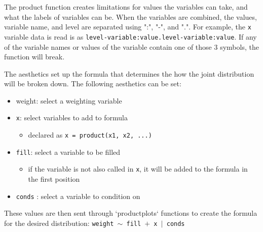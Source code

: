 \documentclass[DIV=calc, paper=a4, fontsize=10pt, twocolumn]{scrartcl}	 %
\begin{document}
\par The product function creates limitations for values the variables can take, and what the labels of variables can be. When the variables are combined, the values, variable name, and level are separated using ":", "-", and ".". For example, the \texttt{x} variable data is read is as \texttt{level-variable:value.level-variable:value}. If any of the variable names or values of the variable contain one of those 3 symbols, the function will break.

\par The aesthetics set up the formula that determines the how the joint distribution will be broken down. The following aesthetics can be set:

\begin{itemize}
\item weight: select a weighting variable
\item \texttt{x}: select variables to add to formula
    \begin{itemize}
    \item declared as \texttt{x = product(x1, x2, ...)}
    \end{itemize}
\item \texttt{fill}: select a variable to be filled
    \begin{itemize}
    \item if the variable is not also called in \texttt{x}, it will be added to the formula in the first position
    \end{itemize}
\item \texttt{conds} : select a variable to condition on
\end{itemize}


\par These values are then sent through `productplots` functions to create the formula for the desired distribution: \texttt{weight $\sim$ fill $+$ x $|$ conds }
\end{document}
